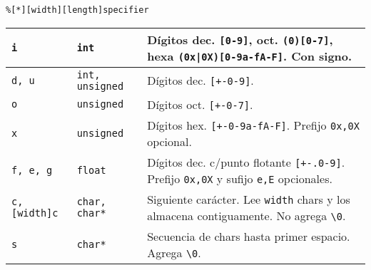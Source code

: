 \texttt{\%{[}{*}{]}{[}width{]}{[}length{]}specifier}

\vspace*{-\baselineskip}

\begin{center}

\vspace{0.2cm}

\tabletail{\hline}
\tablelasttail{\hline}
\footnotesize
{
\begin{xtabular}{|C{.15\columnwidth}|C{.15\columnwidth}|L{.7\columnwidth}|}
\texttt{i}                            & \texttt{int}             & D\'igitos dec. \texttt{{[}0-9{]}}, oct. \texttt{(0){[}0-7{]}}, hexa \texttt{(0x|0X){[}0-9a-fA-F{]}}. Con signo.                                      \\ \hline
\texttt{d, u}                         & \texttt{int, unsigned}   & D\'igitos dec. \texttt{{[}+-0-9{]}}.                                                                                                                 \\ \hline
\texttt{o}                            & \texttt{unsigned}        & D\'igitos oct. \texttt{{[}+-0-7{]}}.                                                                                                                 \\ \hline
\texttt{x}                            & \texttt{unsigned}        & D\'igitos hex. \texttt{{[}+-0-9a-fA-F{]}}. Prefijo \texttt{0x,0X} opcional.                                                                          \\ \hline
\texttt{f, e, g}                      & \texttt{float}           & D\'igitos dec. c/punto flotante \texttt{{[}+-.0-9{]}}. Prefijo \texttt{0x,0X} y sufijo \texttt{e,E} opcionales.                                      \\ \hline
\texttt{c, {[}width{]}c}              & \texttt{char, char*}     & Siguiente car\'acter. Lee \texttt{width} chars y los almacena contiguamente. No agrega \texttt{\textbackslash 0}.                                    \\ \hline
\texttt{s}                            & \texttt{char*}           & Secuencia de chars hasta primer espacio. Agrega \texttt{\textbackslash 0}.                                                                           \\ \hline

\end{xtabular}}
\end{center}

